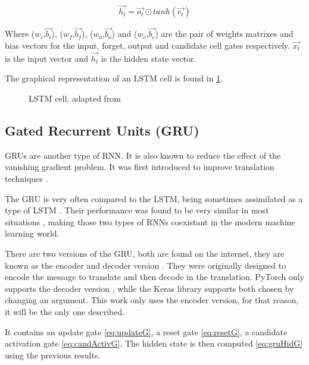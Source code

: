\begin{equation}\label{eq:hiddenS}
  \overrightarrow{h_t}=\overrightarrow{o_t}\odot tanh(\overrightarrow{c_t})
\end{equation}

Where ($w_i$,$\overrightarrow{b_i}$), ($w_f$,$\overrightarrow{b_f}$), ($w_o$,$\overrightarrow{b_o}$) and ($w_c$,$\overrightarrow{b_c}$) are the pair of weights matrixes and bias vectors for the input, forget, output and candidate cell gates respectively. $\overrightarrow{x_t}$ is the input vector and $\overrightarrow{h_t}$ is the hidden state vector.

The graphical representation of an LSTM cell is found in \cref{fig:lstmCell}.

\begin{figure}[t]
  \centering
  
  \caption{\acs{LSTM} cell, adapted from \cite{wikiLSTM}\label{fig:lstmCell}}
\end{figure}

\subsection{Gated Recurrent Units (GRU)}

GRUs are another type of RNN. It is also known to reduce the effect of the vanishing gradient problem. It was first introduced to improve translation techniques \cite{gru}.

The \ac{GRU} is very often compared to the \ac{LSTM}, being sometimes assimilated as a type of \ac{LSTM} \cite{nbLSTM}. Their performance was found to be very similar in most situations \cite{gruVSlstm}, making those two types of \acp{RNN} coexistant in the modern machine learning world.

There are two versions of the \ac{GRU}, both are found on the internet, they are known as the encoder and decoder version \cite{gru}. They were originally designed to encode the message to translate and then decode in the translation. PyTorch only supports the decoder version \cite{gruPyTorch}, while the Keras library supports both \cite{gruKeras} chosen by changing an argument. This work only uses the encoder version, for that reason, it will be the only one described.

It contains an update gate \cref{eq:updateG}, a reset gate \cref{eq:resetG}, a candidate activation gate \cref{eq:candActivG}. The hidden state is then computed \cref{eq:gruHidG} using the previous results.

